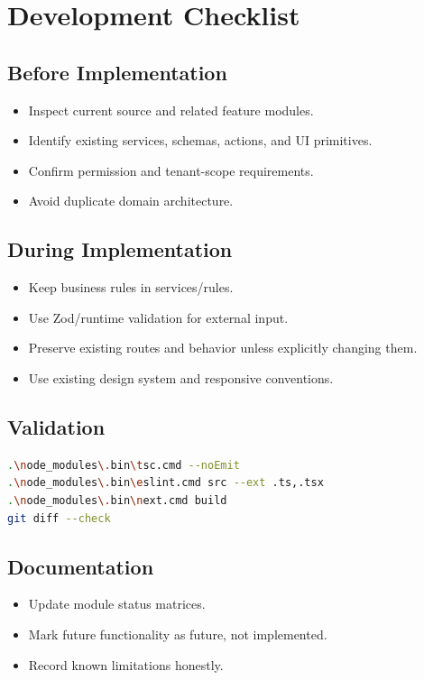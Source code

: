 \chapter{Development Checklist}
\label{app:checklist}
\section{Before Implementation}
\begin{itemize}
\item Inspect current source and related feature modules.
\item Identify existing services, schemas, actions, and UI primitives.
\item Confirm permission and tenant-scope requirements.
\item Avoid duplicate domain architecture.
\end{itemize}

\section{During Implementation}
\begin{itemize}
\item Keep business rules in services/rules.
\item Use Zod/runtime validation for external input.
\item Preserve existing routes and behavior unless explicitly changing them.
\item Use existing design system and responsive conventions.
\end{itemize}

\section{Validation}
\begin{lstlisting}[language=bash]
.\node_modules\.bin\tsc.cmd --noEmit
.\node_modules\.bin\eslint.cmd src --ext .ts,.tsx
.\node_modules\.bin\next.cmd build
git diff --check
\end{lstlisting}

\section{Documentation}
\begin{itemize}
\item Update module status matrices.
\item Mark future functionality as future, not implemented.
\item Record known limitations honestly.
\end{itemize}
